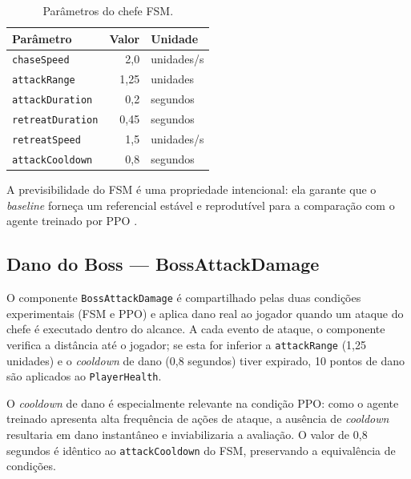 \begin{table}[htb]
    \centering
    \caption{Parâmetros do chefe FSM.}
    \label{tab:fsm-params}
    \begin{tabular}{l r l}
        \toprule
        \textbf{Parâmetro}          & \textbf{Valor} & \textbf{Unidade} \\
        \midrule
        \texttt{chaseSpeed}         & 2,0     & unidades/s         \\
        \texttt{attackRange}        & 1,25    & unidades           \\
        \texttt{attackDuration}     & 0,2     & segundos           \\
        \texttt{retreatDuration}    & 0,45    & segundos           \\
        \texttt{retreatSpeed}       & 1,5     & unidades/s         \\
        \texttt{attackCooldown}     & 0,8     & segundos           \\
        \bottomrule
    \end{tabular}
\end{table}

A previsibilidade do FSM é uma propriedade intencional: ela garante que o
\textit{baseline} forneça um referencial estável e reprodutível para a
comparação com o agente treinado por PPO \cite{millington2019ai}.

\subsection{Dano do Boss --- BossAttackDamage}
\label{subsec:boss-attack-damage}

O componente \texttt{BossAttackDamage} é compartilhado pelas duas condições
experimentais (FSM e PPO) e aplica dano real ao jogador quando um ataque do
chefe é executado dentro do alcance. A cada evento de ataque, o componente
verifica a distância até o jogador; se esta for inferior a
\texttt{attackRange} (1,25 unidades) e o \textit{cooldown} de dano (0,8
segundos) tiver expirado, 10 pontos de dano são aplicados ao
\texttt{PlayerHealth}.

O \textit{cooldown} de dano é especialmente relevante na condição PPO: como
o agente treinado apresenta alta frequência de ações de ataque, a ausência
de \textit{cooldown} resultaria em dano instantâneo e inviabilizaria a
avaliação. O valor de 0,8 segundos é idêntico ao \texttt{attackCooldown}
do FSM, preservando a equivalência de condições.

